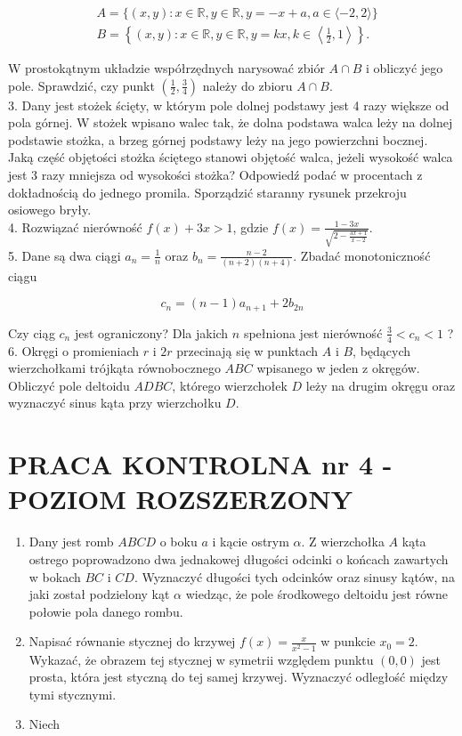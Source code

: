 \documentclass[10pt]{article}
\begin{document}
$$
\begin{aligned}
& A=\{(x, y): x \in \mathbb{R}, y \in \mathbb{R}, y=-x+a, a \in\langle-2,2\rangle\} \\
& B=\left\{(x, y): x \in \mathbb{R}, y \in \mathbb{R}, y=k x, k \in\left\langle\frac{1}{2}, 1\right\rangle\right\} .
\end{aligned}
$$

W prostokątnym układzie współrzędnych narysować zbiór $A \cap B$ i obliczyć jego pole. Sprawdzić, czy punkt $\left(\frac{1}{2}, \frac{3}{4}\right)$ należy do zbioru $A \cap B$.\\
3. Dany jest stożek ścięty, w którym pole dolnej podstawy jest 4 razy większe od pola górnej. W stożek wpisano walec tak, że dolna podstawa walca leży na dolnej podstawie stożka, a brzeg górnej podstawy leży na jego powierzchni bocznej. Jaką część objętości stożka ściętego stanowi objętość walca, jeżeli wysokość walca jest 3 razy mniejsza od wysokości stożka? Odpowiedź podać w procentach z dokładnością do jednego promila. Sporządzić staranny rysunek przekroju osiowego bryły.\\
4. Rozwiązać nierówność $f(x)+3 x>1$, gdzie $f(x)=\frac{1-3 x}{\sqrt{2-\frac{3 x+1}{x-2}}}$.\\
5. Dane są dwa ciągi $a_{n}=\frac{1}{n}$ oraz $b_{n}=\frac{n-2}{(n+2)(n+4)}$. Zbadać monotoniczność ciągu

$$
c_{n}=(n-1) a_{n+1}+2 b_{2 n}
$$

Czy ciąg $c_{n}$ jest ograniczony? Dla jakich $n$ spełniona jest nierówność $\frac{3}{4}<c_{n}<1$ ?\\
6. Okręgi o promieniach $r$ i $2 r$ przecinają się w punktach $A$ i $B$, będących wierzchołkami trójkąta równobocznego $A B C$ wpisanego w jeden z okręgów. Obliczyć pole deltoidu $A D B C$, którego wierzchołek $D$ leży na drugim okręgu oraz wyznaczyć sinus kąta przy wierzchołku $D$.

\section*{PRACA KONTROLNA nr 4 - POZIOM ROZSZERZONY}
\begin{enumerate}
  \item Dany jest romb $A B C D$ o boku $a$ i kącie ostrym $\alpha$. Z wierzchołka $A$ kąta ostrego poprowadzono dwa jednakowej długości odcinki o końcach zawartych w bokach $B C$ i $C D$. Wyznaczyć długości tych odcinków oraz sinusy kątów, na jaki został podzielony kąt $\alpha$ wiedząc, że pole środkowego deltoidu jest równe połowie pola danego rombu.
  \item Napisać równanie stycznej do krzywej $f(x)=\frac{x}{x^{2}-1}$ w punkcie $x_{0}=2$. Wykazać, że obrazem tej stycznej w symetrii względem punktu $(0,0)$ jest prosta, która jest styczną do tej samej krzywej. Wyznaczyć odległość między tymi stycznymi.
  \item Niech
\end{enumerate}
\end{document}
